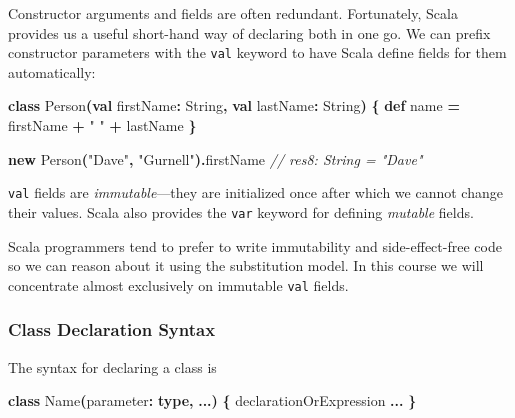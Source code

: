 \documentclass[11pt,a5paper,]{book}
\newenvironment{Shaded}{\begin{snugshade}}{\end{snugshade}}
\newcommand{\CommentTok}[1]{\textcolor[rgb]{0.56,0.35,0.01}{\textit{#1}}}
\newcommand{\ExtensionTok}[1]{#1}
\newcommand{\FunctionTok}[1]{\textcolor[rgb]{0.00,0.00,0.00}{#1}}
\newcommand{\KeywordTok}[1]{\textcolor[rgb]{0.13,0.29,0.53}{\textbf{#1}}}
\newcommand{\NormalTok}[1]{#1}
\newcommand{\OperatorTok}[1]{\textcolor[rgb]{0.81,0.36,0.00}{\textbf{#1}}}
\newcommand{\StringTok}[1]{\textcolor[rgb]{0.31,0.60,0.02}{#1}}
\begin{document}
Constructor arguments and fields are often redundant. Fortunately, Scala
provides us a useful short-hand way of declaring both in one go. We can
prefix constructor parameters with the \texttt{val} keyword to have
Scala define fields for them automatically:

\begin{Shaded}
\begin{Highlighting}[]
\KeywordTok{class} \FunctionTok{Person}\OperatorTok{(}\KeywordTok{val}\NormalTok{ firstName}\OperatorTok{:} \ExtensionTok{String}\OperatorTok{,} \KeywordTok{val}\NormalTok{ lastName}\OperatorTok{:} \ExtensionTok{String}\OperatorTok{)} \OperatorTok{\{}
  \KeywordTok{def}\NormalTok{ name }\OperatorTok{=}\NormalTok{ firstName }\OperatorTok{+} \StringTok{" "} \OperatorTok{+}\NormalTok{ lastName}
\OperatorTok{\}}
\end{Highlighting}
\end{Shaded}

\begin{Shaded}
\begin{Highlighting}[]
\KeywordTok{new} \FunctionTok{Person}\OperatorTok{(}\StringTok{"Dave"}\OperatorTok{,} \StringTok{"Gurnell"}\OperatorTok{).}\NormalTok{firstName}
\CommentTok{// res8: String = "Dave"}
\end{Highlighting}
\end{Shaded}

\texttt{val} fields are \emph{immutable}---they are initialized once
after which we cannot change their values. Scala also provides the
\texttt{var} keyword for defining \emph{mutable} fields.

Scala programmers tend to prefer to write immutability and
side-effect-free code so we can reason about it using the substitution
model. In this course we will concentrate almost exclusively on
immutable \texttt{val} fields.

\hypertarget{class-declaration-syntax}{%
\subsubsection*{Class Declaration
Syntax}\label{class-declaration-syntax}}

The syntax for declaring a class is

\begin{Shaded}
\begin{Highlighting}[]
\KeywordTok{class} \ExtensionTok{Name}\OperatorTok{(}\NormalTok{parameter}\OperatorTok{:} \KeywordTok{type}\OperatorTok{,} \OperatorTok{...)} \OperatorTok{\{}
\NormalTok{  declarationOrExpression }\OperatorTok{...}
\OperatorTok{\}}
\end{Highlighting}
\end{Shaded}
\end{document}
